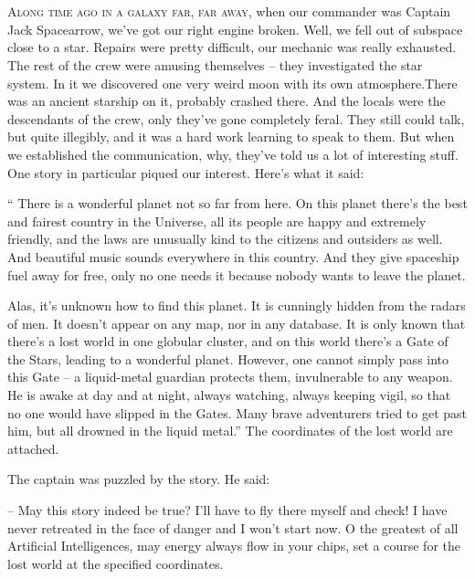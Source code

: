 \documentclass[ebook,oneside,final,openright]{memoir}
\begin{document}
\chapter{}
\par
\lettrine{A}{long time ago in a galaxy far, far away,} when our commander was Captain Jack Spacearrow, we’ve got our right engine broken. Well, we fell out of subspace close to a star. Repairs were pretty difficult, our mechanic was really exhausted. The rest of the crew were amusing themselves – they investigated the star system. In it we discovered one very weird moon with its own atmosphere.There was an ancient starship on it, probably crashed there. And the locals were the descendants of the crew, only they’ve gone completely feral. They still could talk, but quite illegibly, and it was a hard work learning to speak to them. But when we established the communication, why, they’ve told us a lot of interesting stuff. One story in particular piqued our interest. Here’s what it said:\par
\par
“ There is a wonderful planet not so far from here. On this planet there’s the best and fairest country in the Universe, all its people are happy and extremely friendly, and the laws are unusually kind to the citizens and outsiders as well. And beautiful music sounds everywhere in this country. And they give spaceship fuel away for free, only no one needs it because nobody wants to leave the planet. \par
Alas, it’s unknown how to find this planet. It is cunningly hidden from the radars of men. It doesn’t appear on any map, nor in any database. It is only known that there’s a lost world in one globular cluster, and on this world there’s a Gate of the Stars, leading to a wonderful planet. However, one cannot simply pass into this Gate – a liquid-metal guardian protects them, invulnerable to any weapon. He is awake at day and at night, always watching, always keeping vigil, so that no one would have slipped in the Gates. Many brave adventurers tried to get past him, but all drowned in the liquid metal.” The coordinates of the lost world are attached.\par
\par
The captain was puzzled by the story. He said:\par
– May this story indeed be true? I’ll have to fly there myself and check! I have never retreated in the face of danger and I won’t start now. O the greatest of all Artificial Intelligences, may energy always flow in your chips, set a course for the lost world at the specified coordinates.\par
\end{document}
